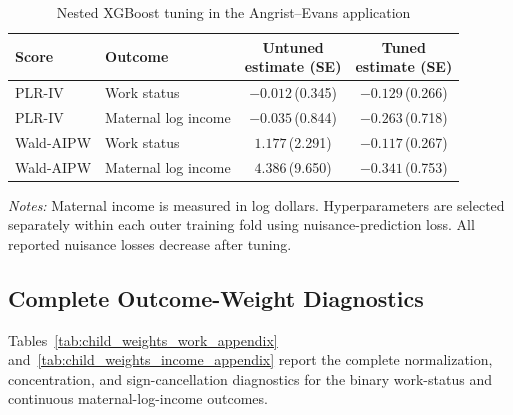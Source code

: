 \documentclass[12pt, a4paper, oneside]{article}
\theoremstyle{plain}
\theoremstyle{definition}
\begin{document}
\begin{table}[H]
\centering
\caption{Nested XGBoost tuning in the Angrist--Evans application}
\label{tab:ae_child_xgb_tuning_appendix}
\small
\setlength{\tabcolsep}{5pt}
\begin{threeparttable}
\begin{tabular}{@{}llcc@{}}
\toprule
Score
& Outcome
& \shortstack{Untuned\\estimate (SE)}
& \shortstack{Tuned\\estimate (SE)} \\
\midrule

PLR-IV
& Work status
& \(-0.012\)\,(0.345)
& \(-0.129\)\,(0.266) \\

PLR-IV
& Maternal log income
& \(-0.035\)\,(0.844)
& \(-0.263\)\,(0.718) \\

Wald-AIPW
& Work status
& \(1.177\)\,(2.291)
& \(-0.117\)\,(0.267) \\

Wald-AIPW
& Maternal log income
& \(4.386\)\,(9.650)
& \(-0.341\)\,(0.753) \\

\bottomrule
\end{tabular}

\begin{tablenotes}
\footnotesize
\item \textit{Notes:} Maternal income is measured in log dollars.
Hyperparameters are selected separately within each outer training fold using
nuisance-prediction loss. All reported nuisance losses decrease after tuning.
\end{tablenotes}
\end{threeparttable}
\end{table}



\subsection{Complete Outcome-Weight Diagnostics}
\label{app:child_weight_diagnostics}

Tables~\ref{tab:child_weights_work_appendix}
and~\ref{tab:child_weights_income_appendix} report the complete
normalization, concentration, and sign-cancellation diagnostics for the binary
work-status and continuous maternal-log-income outcomes. 
\end{document}
